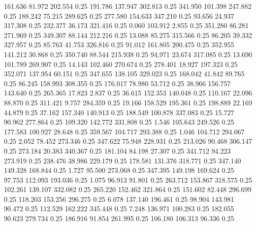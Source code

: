  161.636   81.972  202.554         0.25
 191.786  137.947  302.813         0.25
 341.950  101.398  247.882         0.25
 188.242   75.215  289.625         0.25
 277.580  154.633  347.210         0.25
  93.656   24.937  317.308         0.25
 232.377   36.173  321.416         0.25
   0.060  103.912    2.855         0.25
 351.280   86.281  271.969         0.25
 349.307   88.144  212.216         0.25
  13.088   85.275  315.566         0.25
  86.205   39.332  327.957         0.25
  85.763   41.753  326.816         0.25
  91.012  161.805  200.475         0.25
 352.955  141.212   30.868         0.25
 350.740   88.544  215.938         0.25
  94.971   23.674  317.085         0.25
  13.690  101.789  269.907         0.25
  14.143  102.460  270.674         0.25
 278.401   18.927  197.323         0.25
 352.071  137.954   60.151         0.25
 347.655  138.105  329.023         0.25
 168.042   41.842   89.765         0.25
  86.245  158.993  308.355         0.25
 176.017   78.980   53.712         0.25
  38.966  156.757  143.640         0.25
 265.365   17.823    2.837         0.25
  36.615  152.353  140.048         0.25
 110.167   22.096   88.870         0.25
 311.421    9.757  284.359         0.25
  19.166  158.529  195.361         0.25
 198.889   22.169   44.879         0.25
  37.162  157.340  140.913         0.25
 188.549  100.878  337.083         0.25
  15.727   90.962  277.864         0.25
 109.320  142.772  331.808         0.25
   1.546  105.643  249.526         0.25
 177.583  100.927   28.648         0.25
 359.567  104.717  293.388         0.25
   1.046  104.712  294.067         0.25
   2.052   78.452  273.346         0.25
 347.622   75.948  228.931         0.25
 213.026   90.468  306.147         0.25
 273.184   20.383  340.367         0.25
 181.104   84.198   27.307         0.25
 341.712   94.223  273.919         0.25
 238.476   38.986  229.179         0.25
 178.581  131.376  318.771         0.25
 347.140  149.328  168.844         0.25
   1.727   95.500  273.068         0.25
 347.395  149.198  169.624         0.25
  97.753  112.093  193.036         0.25
   1.075   96.913   91.801         0.25
 263.712  153.867  318.575         0.25
 102.261  139.107  332.082         0.25
 265.220  152.462  321.864         0.25
 151.602   82.448  296.699         0.25
 118.203  153.256  296.275         0.25
   6.078  137.140  196.461         0.25
  98.904  143.981   90.472         0.25
 112.529  162.222  345.448         0.25
   7.248  136.971  100.283         0.25
 182.055   90.623  279.734         0.25
 186.916   91.854  261.995         0.25
 106.180  106.313   96.336         0.25
